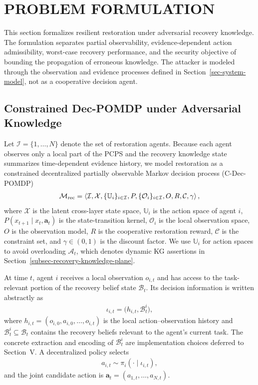 \section{PROBLEM FORMULATION}
\label{sec-problem-formulation}
This section formalizes resilient restoration under adversarial recovery knowledge. The formulation separates partial observability, evidence-dependent action admissibility, worst-case recovery performance, and the security objective of bounding the propagation of erroneous knowledge. The attacker is modeled through the observation and evidence processes defined in Section~\ref{sec-system-model}, not as a cooperative decision agent.

\subsection{Constrained Dec-POMDP under Adversarial Knowledge}
\label{subsec-decpomdp}
Let $\mathcal{I}=\{1,\ldots,N\}$ denote the set of restoration agents. Because each agent observes only a local part of the PCPS and the recovery knowledge state summarizes time-dependent evidence history, we model restoration as a constrained decentralized partially observable Markov decision process (C-Dec-POMDP)
\begin{align}
\label{eq-cdecpomdp}
\mathcal{M}_{\rm rec}=\left\langle
\mathcal{I},\mathcal{X},\{\mathbb{U}_i\}_{i\in\mathcal{I}},
P,\{\mathcal{O}_i\}_{i\in\mathcal{I}},O,R,\mathcal{C},\gamma
\right\rangle,
\end{align}
where $\mathcal{X}$ is the latent cross-layer state space, $\mathbb{U}_i$ is the action space of agent $i$, $P(x_{t+1}\mid x_t,\mathbf{a}_t)$ is the state-transition kernel, $\mathcal{O}_i$ is the local observation space, $O$ is the observation model, $R$ is the cooperative restoration reward, $\mathcal{C}$ is the constraint set, and $\gamma\in(0,1)$ is the discount factor. We use $\mathbb{U}_i$ for action spaces to avoid overloading $\mathcal{A}_t$, which denotes dynamic KG assertions in Section~\ref{subsec-recovery-knowledge-plane}.

At time $t$, agent $i$ receives a local observation $o_{i,t}$ and has access to the task-relevant portion of the recovery belief state $\mathcal{B}_t$. Its decision information is written abstractly as
\begin{align}
\label{eq-information-state}
\iota_{i,t}=\big(h_{i,t},\mathcal{B}^{i}_t\big),
\end{align}
where $h_{i,t}=(o_{i,0},a_{i,0},\ldots,o_{i,t})$ is the local action--observation history and $\mathcal{B}^{i}_t\subseteq\mathcal{B}_t$ contains the recovery beliefs relevant to the agent's current task. The concrete extraction and encoding of $\mathcal{B}^{i}_t$ are implementation choices deferred to Section~V. A decentralized policy selects
\begin{align}
\label{eq-decentralized-policy}
a_{i,t}\sim\pi_i(\cdot\mid\iota_{i,t}),
\end{align}
and the joint candidate action is $\mathbf{a}_t=(a_{1,t},\ldots,a_{N,t})$.

